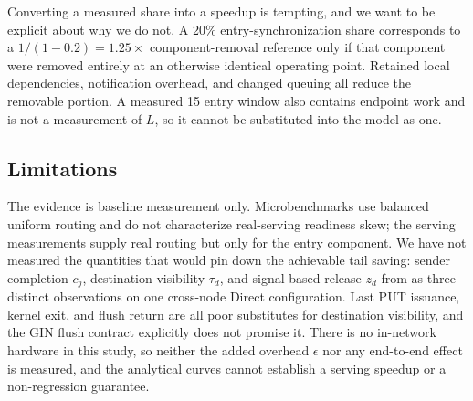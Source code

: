 Converting a measured share into a speedup is tempting, and we want to be explicit
about why we do not. A 20\% entry-synchronization share corresponds to a
$1/(1-0.2) = 1.25\times$ component-removal reference only if that component were
removed entirely at an otherwise identical operating point. Retained local
dependencies, notification overhead, and changed queuing all reduce the removable
portion. A measured 15\us{} entry window also contains endpoint work and is not a
measurement of $L$, so it cannot be substituted into the model as one.

\subsection{Limitations}
\label{sec:limits-evidence}
The evidence is baseline measurement only. Microbenchmarks use balanced uniform routing
and do not characterize real-serving readiness skew; the serving measurements supply
real routing but only for the entry component. We have not measured the quantities that
would pin down the achievable tail saving: sender completion $c_j$, destination
visibility $\tau_d$, and signal-based release $z_d$ from  as
three distinct observations on one cross-node Direct configuration. Last PUT issuance,
kernel exit, and flush return are all poor substitutes for destination visibility, and
the GIN flush contract explicitly does not promise it. There is no in-network hardware
in this study, so neither the added overhead $\epsilon$ nor any end-to-end effect is
measured, and the analytical curves cannot establish a serving speedup or a
non-regression guarantee.

